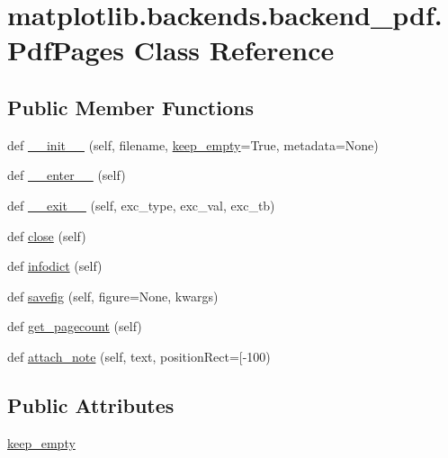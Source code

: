 \hypertarget{classmatplotlib_1_1backends_1_1backend__pdf_1_1PdfPages}{}\section{matplotlib.\+backends.\+backend\+\_\+pdf.\+Pdf\+Pages Class Reference}
\label{classmatplotlib_1_1backends_1_1backend__pdf_1_1PdfPages}
\subsection*{Public Member Functions}
\begin{DoxyCompactItemize}
\item 
def \hyperlink{classmatplotlib_1_1backends_1_1backend__pdf_1_1PdfPages_a6d5caaea4a0cbc5d2d07d9e2b4042dcd}{\+\_\+\+\_\+init\+\_\+\+\_\+} (self, filename, \hyperlink{classmatplotlib_1_1backends_1_1backend__pdf_1_1PdfPages_a15f6698aedae6a9d6c4c26b88daea5d3}{keep\+\_\+empty}=True, metadata=None)
\item 
def \hyperlink{classmatplotlib_1_1backends_1_1backend__pdf_1_1PdfPages_ad4fefcb92522d11ef1e25751190f196a}{\+\_\+\+\_\+enter\+\_\+\+\_\+} (self)
\item 
def \hyperlink{classmatplotlib_1_1backends_1_1backend__pdf_1_1PdfPages_a6f5653c5d7f0ae1cfd7339d085896e1f}{\+\_\+\+\_\+exit\+\_\+\+\_\+} (self, exc\+\_\+type, exc\+\_\+val, exc\+\_\+tb)
\item 
def \hyperlink{classmatplotlib_1_1backends_1_1backend__pdf_1_1PdfPages_a437630511808eb57fd6eb79e6698e752}{close} (self)
\item 
def \hyperlink{classmatplotlib_1_1backends_1_1backend__pdf_1_1PdfPages_a55064807818dfc2461ad45e78ece4f29}{infodict} (self)
\item 
def \hyperlink{classmatplotlib_1_1backends_1_1backend__pdf_1_1PdfPages_a42c462ddfed8228465fefb9321ac4858}{savefig} (self, figure=None, kwargs)
\item 
def \hyperlink{classmatplotlib_1_1backends_1_1backend__pdf_1_1PdfPages_ad7a8dd73d6362c0c61f4be100cfe6a88}{get\+\_\+pagecount} (self)
\item 
def \hyperlink{classmatplotlib_1_1backends_1_1backend__pdf_1_1PdfPages_a05f70733732c65e6df2e25a9437b2a4b}{attach\+\_\+note} (self, text, position\+Rect=\mbox{[}-\/100)
\end{DoxyCompactItemize}
\subsection*{Public Attributes}
\begin{DoxyCompactItemize}
\item 
\hyperlink{classmatplotlib_1_1backends_1_1backend__pdf_1_1PdfPages_a15f6698aedae6a9d6c4c26b88daea5d3}{keep\+\_\+empty}
\end{DoxyCompactItemize}


